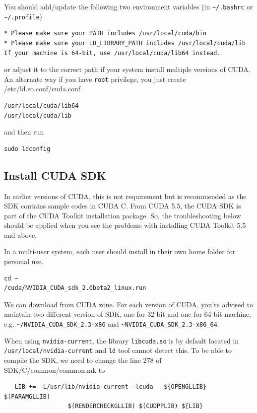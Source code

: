 You should add/update the following two environment variables (in
\verb!~/.bashrc! or \verb!~/.profile!)
\begin{verbatim} 
* Please make sure your PATH includes /usr/local/cuda/bin
* Please make sure your LD_LIBRARY_PATH includes /usr/local/cuda/lib
If your machine is 64-bit, use /usr/local/cuda/lib64 instead.
\end{verbatim}
or adjust it to the correct path if your system install multiple
versions of CUDA. An alternate way if you have \verb!root! privilege, you just
create /etc/ld.so.conf/cuda.conf
\begin{verbatim}
/usr/local/cuda/lib64
/usr/local/cuda/lib
\end{verbatim}
and then run
\begin{verbatim}
sudo ldconfig
\end{verbatim}


\subsection{Install CUDA SDK}
\label{sec:install-sdk}

In earlier versions of CUDA, this is not requirement but is recommended as the
SDK contains sample codes in CUDA C.
From CUDA 5.5, the CUDA SDK is part of the CUDA Toolkit installation package.
So, the troubleshooting below should be applied when you see the problems with
installing CUDA Toolkit 5.5 and above.

In a multi-user system, each user should install in their own home
folder for personal use.
\begin{verbatim}
cd ~
/cuda/NVIDIA_CUDA_sdk_2.0beta2_linux.run
\end{verbatim}
We can download from CUDA zone. 
For each version of
CUDA, you're advised to maintain two different version of SDK, one for
32-bit and one for 64-bit machine, e.g.
\verb!~/NVIDIA_CUDA_SDK_2.3-x86! and
\verb!~NVIDIA_CUDA_SDK_2.3-x86_64!.

When using \verb!nvidia-current!, the library \verb!libcuda.so! is by default
located in \verb!/usr/local/nvidia-current! and \verb!ld! tool cannot detect
this. To be able to compile the SDK, we need to change the line 278 of
SDK/C/common/common.mk to
\begin{verbatim}
   LIB += -L/usr/lib/nvidia-current -lcuda   ${OPENGLLIB} $(PARAMGLLIB) 
                  $(RENDERCHECKGLLIB) $(CUDPPLIB) ${LIB}
\end{verbatim}

